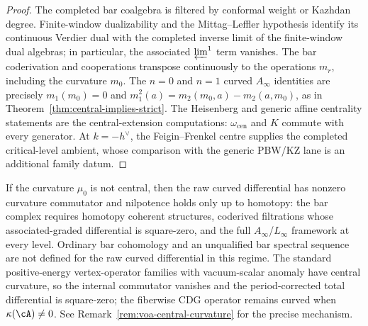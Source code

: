 \begin{proof}
The completed bar coalgebra is filtered by conformal weight or
Kazhdan degree.  Finite-window dualizability and the
Mittag--Leffler hypothesis identify its continuous Verdier dual with
the completed inverse limit of the finite-window dual algebras; in
particular, the associated $\varprojlim^1$ term vanishes.  The bar
coderivation and cooperations transpose continuously to the operations
$m_r$, including the curvature $m_0$. The $n=0$ and $n=1$ curved
$A_\infty$ identities are precisely
$m_1(m_0)=0$ and
$m_1^2(a)=m_2(m_0,a)-m_2(a,m_0)$, as in
Theorem~\ref{thm:central-implies-strict}. The Heisenberg and generic
affine centrality statements are the central-extension computations:
$\omega_{\mathrm{cen}}$ and $K$ commute with every generator.  At
$k=-h^\vee$, the Feigin--Frenkel centre supplies the completed
critical-level ambient, whose comparison with the generic PBW/KZ lane
is an additional family datum.
\end{proof}

\begin{remark}\label{rem:non-central-curvature}
If the curvature $\mu_0$ is not central, then the raw curved
differential has nonzero curvature commutator and nilpotence holds
only up to homotopy: the bar complex requires
homotopy coherent structures, coderived filtrations whose
associated-graded differential is square-zero, and the full
$A_\infty$/$L_\infty$ framework at every level. Ordinary bar
cohomology and an unqualified bar spectral sequence are not defined
for the raw curved differential in this regime. The standard
positive-energy vertex-operator families with vacuum-scalar anomaly
have central curvature, so the internal commutator vanishes and the
period-corrected total differential is square-zero; the fiberwise CDG
operator remains curved when
$\kappa(\cA)\neq0$. See Remark~\ref{rem:voa-central-curvature} for
the precise mechanism.
\end{remark}

